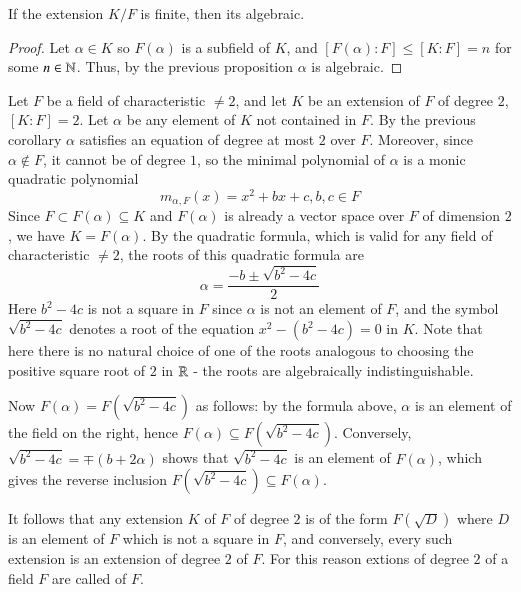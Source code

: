 \documentclass[12pt, a4paper, oneside, openright, titlepage]{book}
\begin{document}
\begin{cor}\label{cor:finalg}
    If the extension $K/F$ is finite, then its algebraic.
\end{cor}
\begin{proof}
    Let $\alpha \in K$ so $F(\alpha)$ is a subfield of $K$, and $[F(\alpha):F] \leq [K:F] = n$ for some $n \in \mathbb N$. Thus, by the previous proposition $\alpha$ is algebraic.
\end{proof}



\begin{eg}\label{eg:quadext}
    Let $F$ be a field of characteristic $\neq 2$, and let $K$ be an extension of $F$ of degree $2$, $[K:F] = 2$. Let $\alpha$ be any element of $K$ not contained in $F$. By the previous corollary $\alpha$ satisfies an equation of degree at most $2$ over $F$. Moreover, since $\alpha \notin F$, it cannot be of degree $1$, so the minimal polynomial of $\alpha$ is a monic quadratic polynomial \begin{equation*}
        m_{\alpha,F}(x) = x^2+bx+c, b,c \in F
    \end{equation*}
    Since $F \subset F(\alpha) \subseteq K$ and $F(\alpha)$ is already a vector space over $F$ of dimension $2$, we have $K = F(\alpha)$. By the quadratic formula, which is valid for any field of characteristic $\neq 2$, the roots of this quadratic formula are \begin{equation*}
        \alpha = \frac{-b\pm \sqrt{b^2-4c}}{2}
    \end{equation*}
    Here $b^2-4c$ is not a square in $F$ since $\alpha$ is not an element of $F$, and the symbol $\sqrt{b^2-4c}$ denotes a root of the equation $x^2-(b^2-4c)=0$ in $K$. Note that here there is no natural choice of one of the roots analogous to choosing the positive square root of $2$ in $\mathbb R$ - the roots are algebraically indistinguishable.


    Now $F(\alpha) = F(\sqrt{b^2-4c})$ as follows: by the formula above, $\alpha$ is an element of the field on the right, hence $F(\alpha) \subseteq F(\sqrt{b^2-4c})$. Conversely, $\sqrt{b^2-4c} = \mp(b+2\alpha)$ shows that $\sqrt{b^2-4c}$ is an element of $F(\alpha)$, which gives the reverse inclusion $F(\sqrt{b^2-4c}) \subseteq F(\alpha)$.
\end{eg}

\begin{cor}
    It follows that any extension $K$ of $F$ of degree $2$ is of the form $F(\sqrt{D})$ where $D$ is an element of $F$ which is not a square in $F$, and conversely, every such extension is an extension of degree $2$ of $F$. For this reason extions of degree $2$ of a field $F$ are called  of $F$.
\end{cor}
\end{document}
